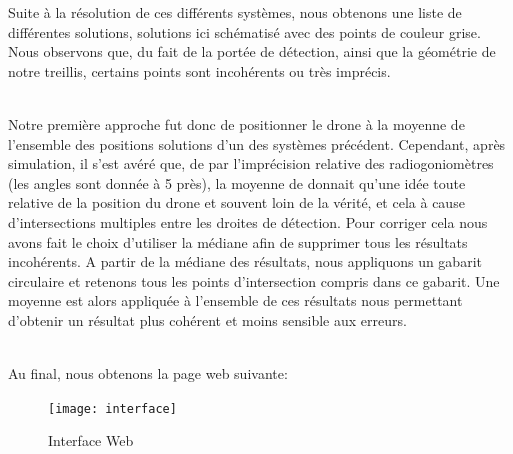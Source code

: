   Suite à la résolution de ces différents systèmes, nous
obtenons une liste de différentes solutions, solutions ici
schématisé avec des points de couleur grise. Nous observons
que, du fait de la portée de détection, ainsi que la géométrie
de notre treillis, certains points sont incohérents ou très
imprécis.

~\\
Notre première approche fut donc de positionner le drone à
la moyenne de l’ensemble des positions solutions d’un des
systèmes précédent. Cependant, après simulation, il s’est
avéré que, de par l’imprécision relative des
radiogoniomètres (les angles sont donnée à 5 près), la moyenne de donnait qu’une idée toute relative de la position du drone et souvent loin de la vérité, et
cela à cause d’intersections multiples entre les droites de détection.
Pour corriger cela nous avons fait le choix d’utiliser la médiane afin de supprimer tous les résultats
incohérents. A partir de la médiane des résultats, nous appliquons un gabarit circulaire et retenons
tous les points d’intersection compris dans ce gabarit. Une moyenne est alors appliquée à l’ensemble
de ces résultats nous permettant d’obtenir un résultat plus cohérent et moins sensible aux erreurs.


~\\
\newpage
Au final, nous obtenons la page web suivante:

\begin{figure}[!h]
  \centering
  \texttt{[image: interface]}
  \caption{Interface Web}
  \label{fig:interface}
\end{figure}





